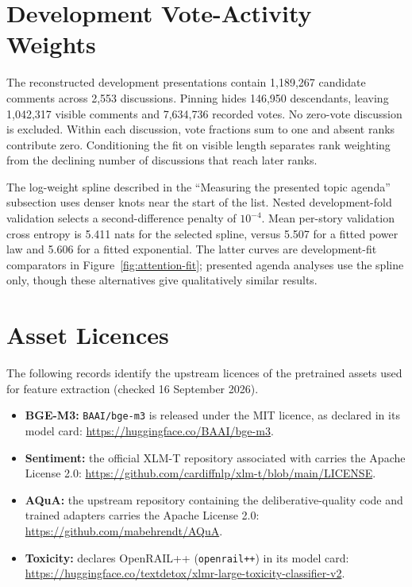 \section{Development Vote-Activity Weights}
\label{app:attention}
The reconstructed development presentations contain 1,189,267 candidate comments across 2,553 discussions. Pinning hides 146,950 descendants, leaving 1,042,317 visible comments and 7,634,736 recorded votes. No zero-vote discussion is excluded. Within each discussion, vote fractions sum to one and absent ranks contribute zero. Conditioning the fit on visible length separates rank weighting from the declining number of discussions that reach later ranks.

The log-weight spline described in the ``Measuring the presented topic agenda'' subsection uses denser knots near the start of the list. Nested development-fold validation selects a second-difference penalty of $10^{-4}$. Mean per-story validation cross entropy is 5.411 nats for the selected spline, versus 5.507 for a fitted power law and 5.606 for a fitted exponential. The latter curves are development-fit comparators in Figure~\ref{fig:attention-fit}; presented agenda analyses use the spline only, though these alternatives give qualitatively similar results. 
\section{Asset Licences}
\label{app:licences}
The following records identify the upstream licences of the pretrained assets used for feature extraction (checked 16 September 2026).
\begin{itemize}
\item \textbf{BGE-M3:} \texttt{BAAI/bge-m3} is released under the MIT licence, as declared in its model card: \url{https://huggingface.co/BAAI/bge-m3}.
\item \textbf{Sentiment:} the official XLM-T repository associated with  carries the Apache License 2.0: \url{https://github.com/cardiffnlp/xlm-t/blob/main/LICENSE}.
\item \textbf{AQuA:} the upstream repository containing the deliberative-quality code and trained adapters carries the Apache License 2.0: \url{https://github.com/mabehrendt/AQuA}.
\item \textbf{Toxicity:}  declares OpenRAIL++ (\texttt{openrail++}) in its model card: \url{https://huggingface.co/textdetox/xlmr-large-toxicity-classifier-v2}.
\end{itemize}

